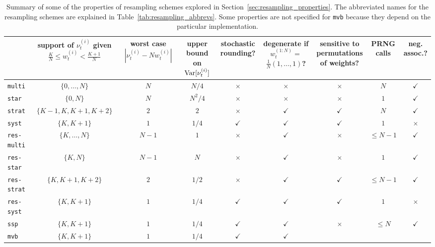 \begin{landscape}
\begin{table}[ht]
\centering
\begin{tabular}{ l | c c c c c c c c }
\hline\hline
& \thead{support of $\nu_t^{(i)}$ given
            \\ $ \frac{K}{N} \leq w_t^{(i)} < \frac{K+1}{N}$} 
        & \thead{worst case\\ $|\nu_t^{(i)} - Nw_t^{(i)}|$}
        & \thead{upper\\ bound on \\ $\operatorname{Var}[\nu_t^{(i)}]$}
        & \thead{stochastic\\ rounding?}       
        & \thead{degenerate if\\ $w_t^{(1:N)} =$\\ $\frac{1}{N}(1,\dots,1)$?} 
        & \thead{sensitive to\\ permutations\\ of weights?} 
        & \thead{PRNG\\ calls}
        & \thead{neg.\\ assoc.?} \\
\hline
\texttt{multi} & $\{0,\dots,N\}$ & $N$ & $N/4$ & $\times$ & $\times$ 
        & $\times$ & $N$ & $\checkmark$ \\
\texttt{star} & $\{0, N\}$ & $N$ & $N^2/4$ & $\times$ & $\times$ 
        & $\times$ & $1$ & $\checkmark$ \\
\texttt{strat} & $\{K-1, K, K+1, K+2\}$ & $2$ & $2$ & $\times$ & $\checkmark$ 
        & $\checkmark$ & $N$ & $\checkmark$ \\
\texttt{syst} & $\{K, K+1\}$ & $1$ & $1/4$ & $\checkmark$ & $\checkmark$ 
        & $\checkmark$ & $1$ & $\times$ \\
\texttt{res-multi} & $\{K,\dots,N\}$ & $N-1$ & $1$ & $\times$ & $\checkmark$ 
        & $\times$ & $\leq N-1$ & $\checkmark$ \\
\texttt{res-star} & $\{K, N\}$ & $N-1$ & $N$ & $\times$ & $\checkmark$ 
        & $\times$ & $1$ & $\checkmark$ \\
\texttt{res-strat} & $\{K, K+1, K+2\}$ & $2$ & $1/2$ & $\times$ & $\checkmark$ 
        & $\checkmark$ & $\leq N-1$ & $\checkmark$ \\
\texttt{res-syst} & $\{K, K+1\}$ & $1$ & $1/4$ & $\checkmark$ & $\checkmark$ 
        & $\checkmark$ & $1$ & $\times$ \\
\texttt{ssp} & $\{K, K+1\}$ & $1$ & $1/4$ & $\checkmark$ & $\checkmark$ 
        & $\times$ & $\leq N$ & $\checkmark$ \\
\texttt{mvb} & $\{K, K+1\}$ & $1$ & $1/4$ & $\checkmark$ & $\checkmark$ 
        & & & \\
\hline\hline
\end{tabular}
\caption[Properties of resampling schemes]{Summary of some of the properties of resampling schemes explored in Section~\ref{sec:resampling_properties}. The abbreviated names for the resampling schemes are explained in Table~\ref{tab:resampling_abbrevs}. Some properties are not specified for \texttt{mvb} because they depend on the particular implementation.}
\label{tab:resampling_properties}
\end{table} 
\end{landscape}
 
